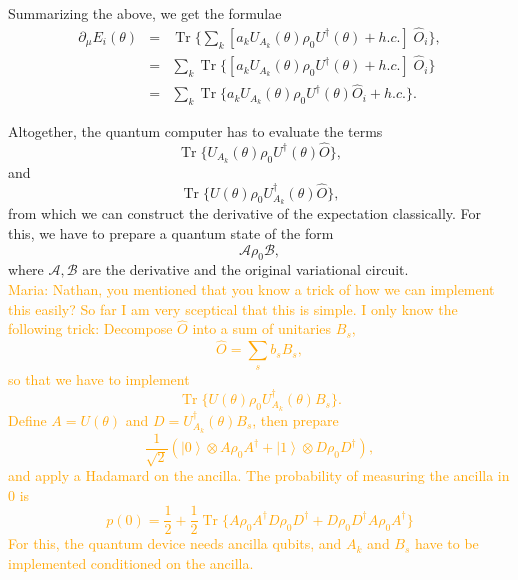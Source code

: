 \documentclass[aps,pra,10pt,twocolumn,groupedaddress,nofootinbib]{revtex4-1}
\theoremstyle{plain}
\DeclareMathOperator{\tr}{Tr}
\newcommand{\ket}[1]{\ensuremath{\left| #1 \right \rangle}}
\newcommand{\maria}[1]{\textcolor{orange}{Maria: #1}}
\begin{document}
Summarizing the above, we get the formulae
\begin{eqnarray*}
        \partial_{\mu} E_i(\theta) &=& \tr \{ \sum_k \left[ a_k  U_{A_k}(\theta) \rho_0 U^{\dagger}(\theta) + h.c. \right] \; \hat{O}_i\}, \\
        &=& \sum_k \tr \{  \left[ a_k  U_{A_k}(\theta) \rho_0 U^{\dagger}(\theta) + h.c. \right] \; \hat{O}_i\}\\
        &=& \sum_k \tr \{   a_k  U_{A_k}(\theta) \rho_0 U^{\dagger}(\theta) \hat{O}_i + h.c. \}.
\end{eqnarray*}

Altogether, the quantum computer has to evaluate the terms
\[ \tr \{  U_{A_k}(\theta) \rho_0 U^{\dagger}(\theta)  \hat{O} \},\]
and
\[ \tr \{  U(\theta) \rho_0 U_{A_k}^{\dagger}(\theta)  \hat{O} \},\]
from which we can construct the derivative of the expectation classically. For this, we have to prepare a quantum state of the form
\[ \mathcal{A} \rho_0 \mathcal{B}, \]
where $ \mathcal{A}, \mathcal{B}$ are the derivative and the original variational circuit. \\

\maria{Nathan, you mentioned that you know a trick of how we can implement this easily? So far I am very sceptical that this is simple. I only know the following trick:
Decompose $\hat{O}$ into a sum of unitaries $B_s$,
\[\hat{O} = \sum_s b_s B_s,\]
so that we have to implement
\[ \tr \{  U(\theta) \rho_0 U_{A_k}^{\dagger}(\theta)  B_s \}.\]
Define $A=U(\theta)$ and $D=U_{A_k}^{\dagger}(\theta)  B_s$, then prepare
\[ \frac{1}{\sqrt{2}} (\ket{0} \otimes A\rho_0 A^{\dagger} + \ket{1} \otimes D\rho_0 D^{\dagger}),\]
and apply a Hadamard on the ancilla. The probability of measuring the ancilla in $0$ is
\[p(0) = \frac{1}{2} + \frac{1}{2} \tr \{ A\rho_0 A^{\dagger} D\rho_0 D^{\dagger} +D\rho_0 D^{\dagger} A\rho_0 A^{\dagger}  \} \]
For this, the quantum device needs ancilla qubits, and $A_k$ and $B_s$ have to be implemented conditioned on the ancilla. }

%

\end{document}
